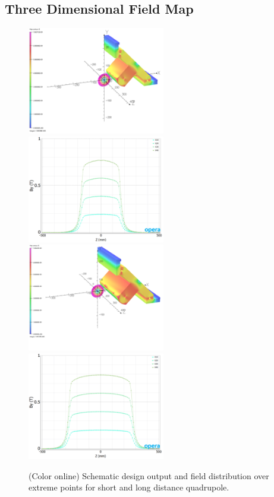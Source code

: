 \documentclass[jkps,preprint,fleqn,showpacs,showkeys,10pt,twocolumn]{revtex4}
\begin{document}
\subsection{Three Dimensional Field Map}
\begin{figure}[t]
  \begin{center}
    \includegraphics[width=6cm]{Fig04-1.png}
    \includegraphics[width=6cm]{Fig04-2.png}
    \includegraphics[width=6cm]{Fig04-3.png}
    \includegraphics[width=6cm]{Fig04-4.png}
    \caption{(Color online) Schematic design output and field distribution
      over extreme points for short and long distance quadrupole.}
    \label{fig3-1}
  \end{center}
\end{figure}
\end{document}
